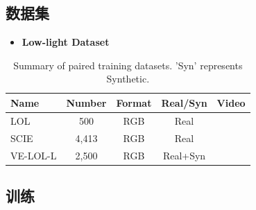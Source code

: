 \documentclass[CJK,aspectratio=169]{beamer}  %
\begin{document}
	\subsection{数据集}
	
	\begin{frame}
		
		
		\begin{itemize} 
			\item \textbf{Low-light Dataset}
		\end{itemize}
		
		\begin{table}[!htbp]
			\centering
			\tiny
				\begin{tabular}{>{\centering\arraybackslash}m{3cm}|c|c|c|c}
					
					\hline
					
					\textbf{Name} & \textbf{Number} & \textbf{Format} & \textbf{Real/Syn} & \textbf{Video} \\
					
					\hline
					
					LOL\textcolor{blue}{\citep{wei2018deep}} & 500 & RGB & Real & \\
					
					SCIE\textcolor{blue}{\citep{cai2018learning}} & 4,413 & RGB & Real & \\
					
					VE-LOL-L\textcolor{blue}{\citep{jiang2019learning}} & 2,500 & RGB & Real+Syn & \\
					
					\hline
					
				\end{tabular}
			\captionsetup{font=scriptsize} %
			\caption{\label{tab: Paired_training_datases}
				Summary of paired training datasets. 'Syn' represents Synthetic.} %
			
		\end{table}
	\end{frame}
	
	\subsection{训练}
	
\end{document}
